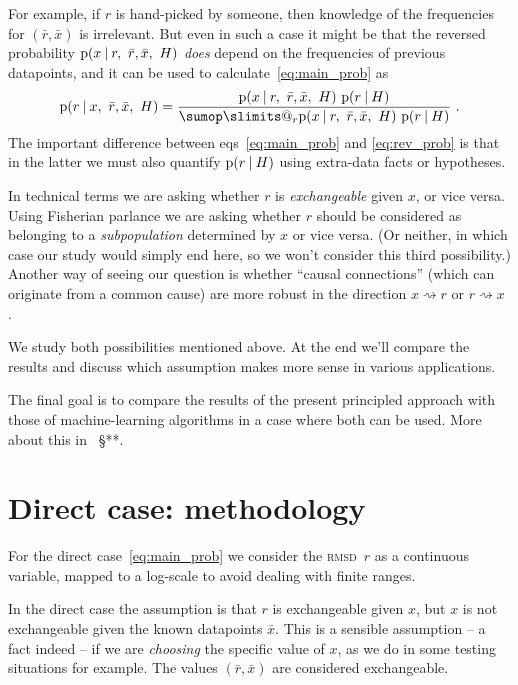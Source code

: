 \documentclass[\ifafour a4paper,12pt,\else a5paper,10pt,\fi%
onecolumn,oneside,article,%
british%
]{memoir}
\makeatletter
\theoremstyle{remark}
\theoremstyle{innote}
\def\sum{\DOTSI\sumop\slimits@}
\newcommand*{\citey}{\parencites*}
\newcommand*{\p}{\mathrm{p}}%
\renewcommand*{\|}[1][]{\nonscript\:#1\vert\nonscript\:\mathopen{}}
\renewcommand*{\=}{\TextOrMath\texteq\eq}
\newcommand*{\sect}{\S}%
\newcommand*{\sects}{\S\S}%
\newcommand*{\eqns}{eqs}%
\newcommand*{\cf}{{cf.}}
\newcommand*{\wrench}{{\fontencoding{U}\fontfamily{fontawesomethree}\selectfont\symbol{114}}}
\newcommand{\mynote}[1]{ {\color{notecolour}#1}}
\newcommand*{\rmsd}{\textsc{rmsd}}
\newcommand*{\ro}{r}
\newcommand*{\xo}{x}
\newcommand*{\rd}{\bar{r}}
\newcommand*{\xd}{\bar{x}}
\makeatother
\begin{document}
For example, if $\ro$ is
hand-picked by someone, then knowledge of the frequencies for $(\rd,\xd)$
is irrelevant. But even in such a case it might be that the reversed
probability $\p(\xo \| \ro,\ \rd,\xd,\ H)$ \emph{does} depend on the
frequencies of previous datapoints, and it can be used to
calculate~\eqref{eq:main_prob} as
\begin{equation}
  \label{eq:rev_prob}
  \p(\ro \| \xo,\ \rd,\xd,\ H) =
  \frac{\p(\xo \| \ro,\ \rd,\xd,\ H)\ \p(\ro \| H)}{
    \sum_{\ro}\p(\xo \| \ro,\ \rd,\xd,\ H)\ \p(\ro \| H)}
\ .
\end{equation}
The important difference between \eqns~\eqref{eq:main_prob} and
\eqref{eq:rev_prob} is that in the latter we must also quantify
$\p(\ro \| H)$ using extra-data facts or hypotheses.

In technical terms we are asking whether $\ro$ is \emph{exchangeable}
given $\xo$, or vice versa. Using Fisherian \citey[\sects~II.4,
IV.1]{fisher1956} parlance we are asking whether $\ro$ should be
considered as belonging to a \emph{subpopulation} determined by $\xo$ or
vice versa. (Or neither, in which case our study would simply end here, so
we won't consider this third possibility.) Another way of seeing our
question is whether \enquote{causal connections} (which can originate from
a common cause) are more robust in the direction
$\xo \rightsquigarrow \ro$ or $\ro \rightsquigarrow \xo$
\parencites[\cf][\sects~2.1.2, 2.2.5]{pearl1988}.


We study both possibilities mentioned above. At the end we'll compare the
results and discuss which assumption makes more sense in various
applications.

The final goal is to compare the results of the present principled approach
with those of machine-learning algorithms in a case where both can be used.
More about this in \mynote{\wrench\ \sect***}.


\section{Direct case: methodology}
\label{sec:direct_method}

For the direct case~\eqref{eq:main_prob} we consider the \rmsd\ $r$ as a
continuous variable, mapped to a log-scale to avoid dealing with finite
ranges.

In the direct case the assumption is that $\ro$ is exchangeable given
$\xo$, but $\xo$ is not exchangeable given the known datapoints $\xd$.
This is a sensible assumption -- a fact indeed -- if we are \emph{choosing}
the specific value of $\xo$, as we do in some testing situations for
example. The values $(\rd,\xd)$ are considered exchangeable.
\end{document}
